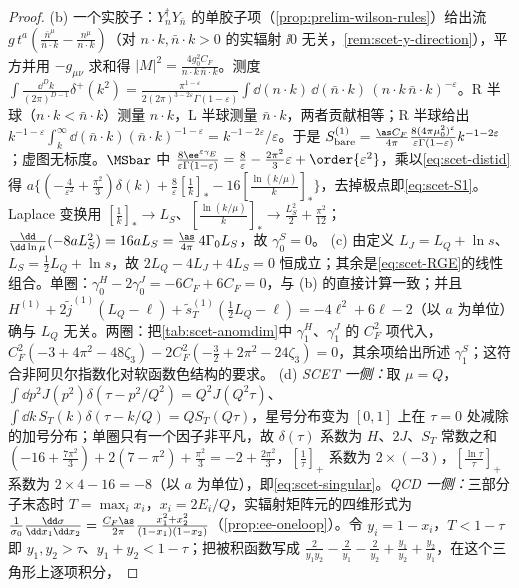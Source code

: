 \begin{proof}
(b) 一个实胶子：$Y_n^\dagger Y_{\bar n}$ 的单胶子项（\cref{prop:prelim-wilson-rules}）给出流 $g\,t^a(\frac{\bar n^\mu}{\bar n\cdot k}-\frac{n^\mu}{n\cdot k})$（对 $n\cdot k,\bar n\cdot k>0$ 的实辐射 $\ii0$ 无关，\cref{rem:scet-y-direction}），平方并用 $-g_{\mu\nu}$ 求和得 $|M|^2=\frac{4g_0^2C_F}{n\cdot k\,\bar n\cdot k}$。测度 $\int\frac{\dd^Dk}{(2\pi)^{D-1}}\delta^+(k^2)=\frac{\pi^{1-\varepsilon}}{2(2\pi)^{3-2\varepsilon}\Gamma(1-\varepsilon)}\int\dd(n\cdot k)\,\dd(\bar n\cdot k)\,(n\cdot k\,\bar n\cdot k)^{-\varepsilon}$。R 半球（$n\cdot k<\bar n\cdot k$）测量 $n\cdot k$，L 半球测量 $\bar n\cdot k$，两者贡献相等；R 半球给出 $k^{-1-\varepsilon}\int_k^\infty\dd(\bar n\cdot k)(\bar n\cdot k)^{-1-\varepsilon}=k^{-1-2\varepsilon}/\varepsilon$。于是 $S^{(1)}_{\rm bare}=\frac{\as C_F}{4\pi}\frac{8(4\pi\mu_0^2)^\varepsilon}{\varepsilon\Gamma(1-\varepsilon)}k^{-1-2\varepsilon}$；虚图无标度。$\MSbar$ 中 $\frac{8\ee^{\varepsilon\gamma_E}}{\varepsilon\Gamma(1-\varepsilon)}=\frac8\varepsilon-\frac{2\pi^2}{3}\varepsilon+\order{\varepsilon^2}$，乘以\cref{eq:scet-distid}得 $a\{(-\frac4{\varepsilon^2}+\frac{\pi^2}3)\delta(k)+\frac8\varepsilon[\frac1k]_*-16[\frac{\ln(k/\mu)}{k}]_*\}$，去掉极点即\cref{eq:scet-S1}。Laplace 变换用 $[\frac1k]_*\to L_S$、$[\frac{\ln(k/\mu)}k]_*\to\frac{L_S^2}2+\frac{\pi^2}{12}$；$\frac{\dd}{\dd\ln\mu}(-8aL_S^2)=16aL_S=\frac{\as}{4\pi}\,4\Gamma_0L_S$，故 $\gamma^S_0=0$。%
(c) 由定义 $L_J=L_Q+\ln s$、$L_S=\frac12L_Q+\ln s$，故 $2L_Q-4L_J+4L_S=0$ 恒成立；其余是\cref{eq:scet-RGE}的线性组合。单圈：$\gamma^H_0-2\gamma^J_0=-6C_F+6C_F=0$，与 (b) 的直接计算一致；并且 $H^{(1)}+2\tilde j^{(1)}(L_Q-\ell)+\tilde s^{(1)}_T(\frac12L_Q-\ell)=-4\ell^2+6\ell-2$（以 $a$ 为单位）确与 $L_Q$ 无关。两圈：把\cref{tab:scet-anomdim}中 $\gamma^H_1$、$\gamma^J_1$ 的 $C_F^2$ 项代入，$C_F^2(-3+4\pi^2-48\zeta_3)-2C_F^2(-\frac32+2\pi^2-24\zeta_3)=0$，其余项给出所述 $\gamma^S_1$；这符合非阿贝尔指数化对软函数色结构的要求。%
(d) \emph{SCET 一侧：}取 $\mu=Q$，$\int\dd p^2J(p^2)\delta(\tau-p^2/Q^2)=Q^2J(Q^2\tau)$、$\int\dd k\,S_T(k)\delta(\tau-k/Q)=QS_T(Q\tau)$，星号分布变为 $[0,1]$ 上在 $\tau=0$ 处减除的加号分布；单圈只有一个因子非平凡，故 $\delta(\tau)$ 系数为 $H$、$2J$、$S_T$ 常数之和 $(-16+\frac{7\pi^2}3)+2(7-\pi^2)+\frac{\pi^2}3=-2+\frac{2\pi^2}{3}$，$[\frac1\tau]_+$ 系数为 $2\times(-3)$，$[\frac{\ln\tau}\tau]_+$ 系数为 $2\times4-16=-8$（以 $a$ 为单位），即\cref{eq:scet-singular}。\emph{QCD 一侧：}三部分子末态时 $T=\max_ix_i$，$x_i=2E_i/Q$，实辐射矩阵元的四维形式为 $\frac1{\sigma_0}\frac{\dd\sigma}{\dd x_1\dd x_2}=\frac{C_F\as}{2\pi}\frac{x_1^2+x_2^2}{(1-x_1)(1-x_2)}$（\cref{prop:ee-oneloop}）。令 $y_i=1-x_i$，$T<1-\tau$ 即 $y_1,y_2>\tau$、$y_1+y_2<1-\tau$；把被积函数写成 $\frac{2}{y_1y_2}-\frac2{y_1}-\frac2{y_2}+\frac{y_1}{y_2}+\frac{y_2}{y_1}$，在这个三角形上逐项积分，

\end{proof}
